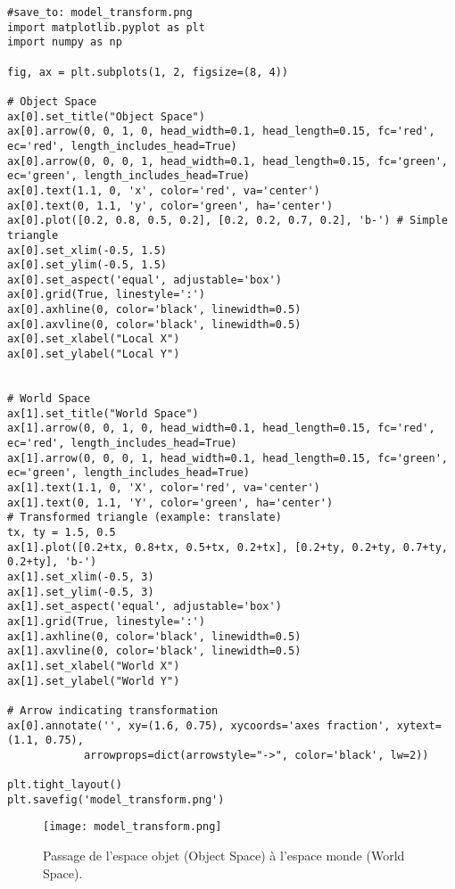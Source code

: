 \documentclass{article}
\begin{document}
\begin{verbatim}
#save_to: model_transform.png
import matplotlib.pyplot as plt
import numpy as np

fig, ax = plt.subplots(1, 2, figsize=(8, 4))

# Object Space
ax[0].set_title("Object Space")
ax[0].arrow(0, 0, 1, 0, head_width=0.1, head_length=0.15, fc='red', ec='red', length_includes_head=True)
ax[0].arrow(0, 0, 0, 1, head_width=0.1, head_length=0.15, fc='green', ec='green', length_includes_head=True)
ax[0].text(1.1, 0, 'x', color='red', va='center')
ax[0].text(0, 1.1, 'y', color='green', ha='center')
ax[0].plot([0.2, 0.8, 0.5, 0.2], [0.2, 0.2, 0.7, 0.2], 'b-') # Simple triangle
ax[0].set_xlim(-0.5, 1.5)
ax[0].set_ylim(-0.5, 1.5)
ax[0].set_aspect('equal', adjustable='box')
ax[0].grid(True, linestyle=':')
ax[0].axhline(0, color='black', linewidth=0.5)
ax[0].axvline(0, color='black', linewidth=0.5)
ax[0].set_xlabel("Local X")
ax[0].set_ylabel("Local Y")


# World Space
ax[1].set_title("World Space")
ax[1].arrow(0, 0, 1, 0, head_width=0.1, head_length=0.15, fc='red', ec='red', length_includes_head=True)
ax[1].arrow(0, 0, 0, 1, head_width=0.1, head_length=0.15, fc='green', ec='green', length_includes_head=True)
ax[1].text(1.1, 0, 'X', color='red', va='center')
ax[1].text(0, 1.1, 'Y', color='green', ha='center')
# Transformed triangle (example: translate)
tx, ty = 1.5, 0.5
ax[1].plot([0.2+tx, 0.8+tx, 0.5+tx, 0.2+tx], [0.2+ty, 0.2+ty, 0.7+ty, 0.2+ty], 'b-')
ax[1].set_xlim(-0.5, 3)
ax[1].set_ylim(-0.5, 3)
ax[1].set_aspect('equal', adjustable='box')
ax[1].grid(True, linestyle=':')
ax[1].axhline(0, color='black', linewidth=0.5)
ax[1].axvline(0, color='black', linewidth=0.5)
ax[1].set_xlabel("World X")
ax[1].set_ylabel("World Y")

# Arrow indicating transformation
ax[0].annotate('', xy=(1.6, 0.75), xycoords='axes fraction', xytext=(1.1, 0.75),
            arrowprops=dict(arrowstyle="->", color='black', lw=2))

plt.tight_layout()
plt.savefig('model_transform.png')
\end{verbatim}

\begin{figure}[H]
\centering
\texttt{[image: model\_transform.png]}
\caption{Passage de l'espace objet (Object Space) à l'espace monde (World Space).}
\label{fig:model_transform}
\end{figure}
\end{document}
